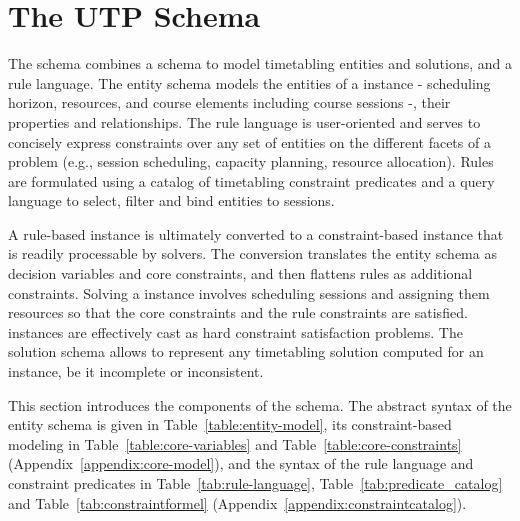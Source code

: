 \section{The UTP Schema}
\label{sec:schema}
The \UTP{} schema %
combines a schema to model timetabling entities and solutions, 
and a rule language.
The entity schema %
models the entities of a \UTP{} instance
- scheduling horizon, resources, and course elements including course sessions -,
their properties and relationships.
The rule language is user-oriented
and serves to concisely express constraints
over any set of entities
on the different facets of a problem (e.g., session scheduling, capacity planning, resource allocation).
Rules are %
formulated
using a catalog of timetabling constraint predicates
and a query language to select, filter and bind entities to sessions. 

A rule-based \UTP{} instance is ultimately 
converted
to a constraint-based instance
that is readily processable by solvers.
The conversion 
translates the entity schema as decision variables and core constraints, and then flattens rules as additional constraints.
Solving a \UTP{} instance involves scheduling sessions
and assigning them resources 
so that the core constraints and the rule constraints are satisfied.
\UTP{} instances are effectively cast as hard constraint satisfaction problems. The solution schema allows to represent
any timetabling solution computed for an instance,
be it incomplete or inconsistent.

This section introduces
the components of the schema.
The abstract syntax of the entity schema
is given in Table~\ref{table:entity-model},
its constraint-based modeling in
Table~\ref{table:core-variables} and
Table~\ref{table:core-constraints}
(Appendix~\ref{appendix:core-model}),
and the syntax of the rule language
and constraint predicates in
Table~\ref{tab:rule-language},
Table~\ref{tab:predicate_catalog} and
Table~\ref{tab:constraintformel}
(Appendix~\ref{appendix:constraintcatalog}).





% 
